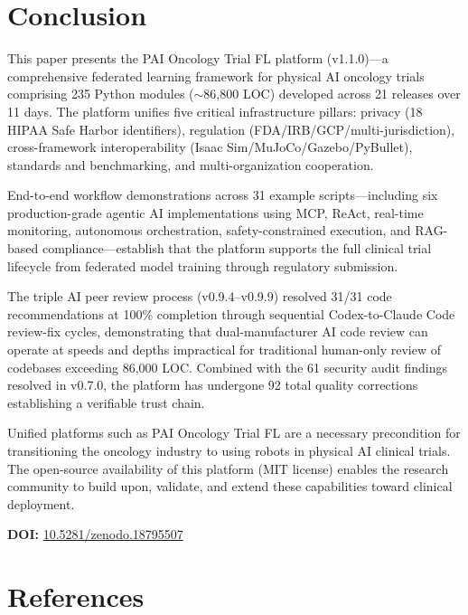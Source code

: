 \documentclass[10pt]{article}
\begin{document}
\section{Conclusion}
\label{sec:conclusion}

This paper presents the PAI Oncology Trial FL platform (v1.1.0)---a comprehensive federated learning framework for physical AI oncology trials comprising 235 Python modules ($\sim$86,800 LOC) developed across 21 releases over 11 days. The platform unifies five critical infrastructure pillars: privacy (18 HIPAA Safe Harbor identifiers), regulation (FDA/IRB/GCP/multi-jurisdiction), cross-framework interoperability (Isaac Sim/MuJoCo/Gazebo/PyBullet), standards and benchmarking, and multi-organization cooperation.

End-to-end workflow demonstrations across 31 example scripts---including six production-grade agentic AI implementations using MCP, ReAct, real-time monitoring, autonomous orchestration, safety-constrained execution, and RAG-based compliance---establish that the platform supports the full clinical trial lifecycle from federated model training through regulatory submission.

The triple AI peer review process (v0.9.4--v0.9.9) resolved 31/31 code recommendations at 100\% completion through sequential Codex-to-Claude Code review-fix cycles, demonstrating that dual-manufacturer AI code review can operate at speeds and depths impractical for traditional human-only review of codebases exceeding 86,000 LOC. Combined with the 61 security audit findings resolved in v0.7.0, the platform has undergone 92 total quality corrections establishing a verifiable trust chain.

Unified platforms such as PAI Oncology Trial FL are a necessary precondition for transitioning the oncology industry to using robots in physical AI clinical trials. The open-source availability of this platform (MIT license) enables the research community to build upon, validate, and extend these capabilities toward clinical deployment.

\textbf{DOI:} \href{https://doi.org/10.5281/zenodo.18795507}{10.5281/zenodo.18795507}

\section*{References}
\end{document}
